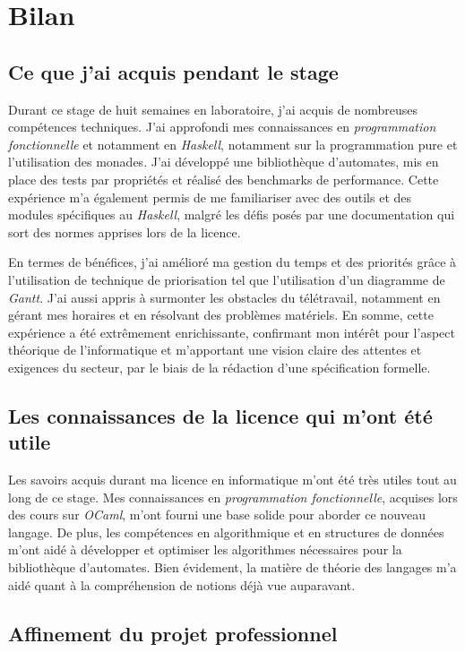 \section{Bilan}

\subsection{Ce que j'ai acquis pendant le stage}

Durant ce stage de huit semaines en laboratoire, j'ai acquis de nombreuses 
compétences techniques. J'ai approfondi mes connaissances en 
\textit{programmation fonctionnelle} et notamment en \textit{Haskell}, notamment 
sur la programmation pure et l'utilisation des monades. J'ai développé une 
bibliothèque d'automates, mis en place des tests par propriétés et réalisé des 
benchmarks de performance. Cette expérience m'a également permis de me 
familiariser avec des outils et des modules spécifiques au \textit{Haskell}, 
malgré les défis posés par une documentation qui sort des normes apprises lors 
de la licence. 

\vphantom{}

En termes de bénéfices, j'ai amélioré ma gestion du temps et des priorités grâce 
à l'utilisation de technique de priorisation tel que l'utilisation d'un 
diagramme de \textit{Gantt}. J'ai aussi appris à surmonter les obstacles du 
télétravail, notamment en gérant mes horaires et en résolvant des problèmes 
matériels. En somme, cette expérience a été extrêmement enrichissante, 
confirmant mon intérêt pour l'aspect théorique de l'informatique et m'apportant 
une vision claire des attentes et exigences du secteur, par le biais de la 
rédaction d'une spécification formelle.

\subsection{Les connaissances de la licence qui m'ont été utile}

Les savoirs acquis durant ma licence en informatique m'ont été très utiles tout 
au long de ce stage. Mes connaissances en \textit{programmation fonctionnelle}, 
acquises lors des cours sur \textit{OCaml}, m'ont fourni une base solide pour 
aborder ce nouveau langage. De plus, les compétences en algorithmique et en 
structures de données m'ont aidé à développer et optimiser les algorithmes 
nécessaires pour la bibliothèque d'automates. Bien évidement, la matière de 
théorie des langages m’a aidé quant à la compréhension de notions déjà vue 
auparavant.


\subsection{Affinement du projet professionnel}

